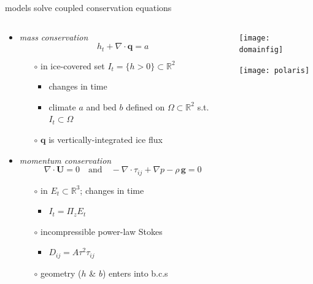 \documentclass[xcolor={dvipsnames}]{beamer}
\newcommand\bq{\mathbf{q}}
\newcommand\bU{\mathbf{U}}
\newcommand\RR{\mathbb{R}}
\newcommand\Div{\nabla\cdot}
\begin{document}
\begin{frame}{models solve coupled conservation equations}

\begin{columns}
\begin{column}{0.7\textwidth}
\begin{itemize}
\small
\item \emph{mass conservation}
\begin{equation*}
h_t + \Div\bq = a
\end{equation*}
    \begin{itemize}
    \footnotesize
    \vspace{-5mm}
    \item[$\circ$] in ice-covered set $I_t = \{h>0\} \subset \RR^2$
        \begin{itemize}
        \item changes in time
        \item climate $a$ and bed $b$ defined on $\Omega\subset \RR^2$ s.t.~$I_t\subset\Omega$
        \end{itemize}
    \item[$\circ$] $\bq$ is vertically-integrated ice flux
    \end{itemize}
\item \emph{momentum conservation}
\begin{equation*}
  \nabla \cdot \bU = 0 \quad \text{and} \quad - \nabla \cdot \tau_{ij} + \nabla p - \rho\, \mathbf{g} = 0
\end{equation*}
    \begin{itemize}
    \footnotesize
    \vspace{-5mm}
    \item[$\circ$] in $E_t \subset \RR^3$; changes in time
        \begin{itemize}
        \item $I_t = \Pi_z E_t$
        \end{itemize}
    \item[$\circ$] incompressible power-law Stokes
        \begin{itemize}
        \item $D_{ij} = A \tau^{2} \tau_{ij}$
        \end{itemize}
    \item[$\circ$] geometry ($h$ \& $b$) enters into b.c.s
    \end{itemize}
\end{itemize}
\end{column}
\begin{column}{0.3\textwidth}
\texttt{[image: domainfig]}

\vspace{0.5in}
\texttt{[image: polaris]}
\end{column}
\end{columns}
\end{frame}
\end{document}
